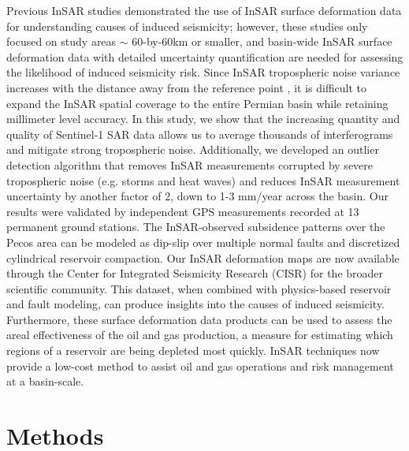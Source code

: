 \documentclass{utexasthesis}
\begin{document}
Previous InSAR studies demonstrated the use of InSAR surface deformation data for understanding causes of induced seismicity; however, these studies only focused on study areas $ \sim $ 60-by-60km or smaller, and basin-wide InSAR surface deformation data with detailed uncertainty quantification are needed for assessing the likelihood of induced seismicity risk. Since InSAR tropospheric noise variance increases with the distance away from the reference point \citep{Emardson2003NeutralAtmosphericDelay}, it is difficult to expand the InSAR spatial coverage to the entire Permian basin while retaining millimeter level accuracy. In this study, we show that the increasing quantity and quality of Sentinel-1 SAR data allows us to average thousands of interferograms and mitigate strong tropospheric noise. Additionally, we developed an outlier detection algorithm that removes InSAR measurements corrupted by severe tropospheric noise (e.g. storms and heat waves) and reduces InSAR measurement uncertainty by another factor of 2, down to 1-3 mm/year across the basin. Our results were validated by independent GPS measurements recorded at 13 permanent ground stations. The InSAR-observed subsidence patterns over the Pecos area can be modeled as dip-slip over multiple normal faults and discretized cylindrical reservoir compaction. Our InSAR deformation maps are now available through the Center for Integrated Seismicity Research (CISR) for the broader scientific community. This dataset, when combined with physics-based reservoir and fault modeling, can produce insights into the causes of induced seismicity. Furthermore, these surface deformation data products can be used to assess the areal effectiveness of the oil and gas production, a measure for estimating which regions of a reservoir are being depleted most quickly. InSAR techniques now provide a low-cost method to assist oil and gas operations and risk management at a basin-scale.

\section{Methods}
\end{document}
